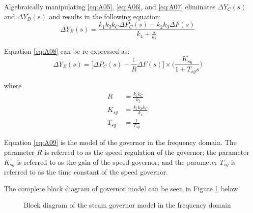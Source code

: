 Algebraically manipulating \ref{eq:A05}, \ref{eq:A06}, and \ref{eq:A07} eliminates $\Delta Y_C(s)$ and $\Delta Y_D(s)$ and results in the following equation:
\begin{equation}
	\Delta Y_E(s) = \frac{k_1 k_3 k_C \Delta P_C(s) - k_2 k_3 \Delta F(s)}{k_4 + \frac{s}{k_5}} \label{eq:A08}
\end{equation}

Equation \ref{eq:A08} can be re-expressed as:
\begin{equation}
	\Delta Y_E(s) = \bigg[ \Delta P_C(s) - \frac{1}{R} \Delta F(s) \bigg] \times \bigg( \frac{K_{sg}}{1 + T_{sg}s} \bigg) \label{eq:A09}
\end{equation}

where
\begin{align}
	R &= \frac{k_1 k_C}{k_2} \\
	K_{sg} &= \frac{k_1 k_3 k_C}{k_4} \\
	T_{sg} &= \frac{1}{T_{sg}} 
\end{align}

Equation \ref{eq:A09} is the model of the governor in the frequency domain. The parameter $R$ is referred to as the speed regulation of the governor; the parameter $K_{sg}$ is referred to as the gain of the speed governor; and the parameter $T_{sg}$ is referred to as the time constant of the speed governor.

The complete block diagram of governor model can be seen in Figure \ref{fig:A02_governor_model} below.

\begin{figure}[h]
	\centering
	
	\caption[Steam governor model]{Block diagram of the steam governor model in the frequency domain}
	\label{fig:A02_governor_model}
\end{figure}